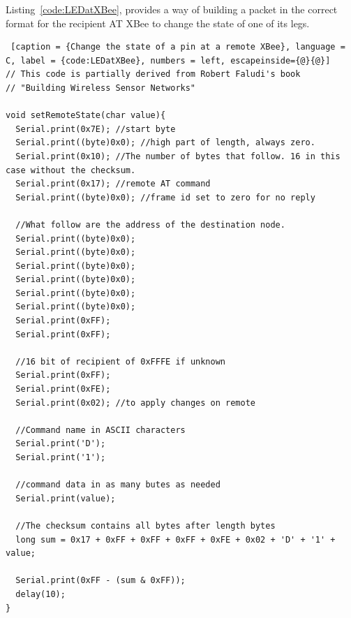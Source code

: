 Listing~\ref{code:LEDatXBee}, provides a way of building a packet in the correct format for the recipient AT XBee to change the state of one of its legs.

\begin{lstlisting} [caption = {Change the state of a pin at a remote XBee}, language = C, label = {code:LEDatXBee}, numbers = left, escapeinside={@}{@}]
// This code is partially derived from Robert Faludi's book
// "Building Wireless Sensor Networks"

void setRemoteState(char value){
  Serial.print(0x7E); //start byte
  Serial.print((byte)0x0); //high part of length, always zero.
  Serial.print(0x10); //The number of bytes that follow. 16 in this case without the checksum.
  Serial.print(0x17); //remote AT command
  Serial.print((byte)0x0); //frame id set to zero for no reply
  
  //What follow are the address of the destination node.
  Serial.print((byte)0x0);
  Serial.print((byte)0x0);
  Serial.print((byte)0x0);
  Serial.print((byte)0x0);
  Serial.print((byte)0x0);
  Serial.print((byte)0x0);
  Serial.print(0xFF);
  Serial.print(0xFF);

  //16 bit of recipient of 0xFFFE if unknown
  Serial.print(0xFF);
  Serial.print(0xFE);
  Serial.print(0x02); //to apply changes on remote
  
  //Command name in ASCII characters
  Serial.print('D');
  Serial.print('1');
  
  //command data in as many butes as needed
  Serial.print(value);
  
  //The checksum contains all bytes after length bytes
  long sum = 0x17 + 0xFF + 0xFF + 0xFF + 0xFE + 0x02 + 'D' + '1' + value;
  
  Serial.print(0xFF - (sum & 0xFF));
  delay(10);
}

\end{lstlisting}